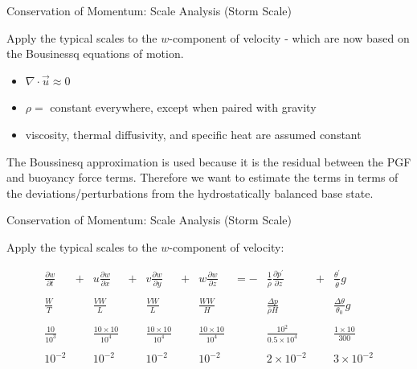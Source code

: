 \begin{frame}{Conservation of Momentum: Scale Analysis (Storm Scale)}

Apply the typical scales to the $w$-component of velocity - which are now based on the Bousinessq equations of motion.

\begin{itemize}
\item $\nabla \cdot \vec{u} \approx 0$
\item $\rho =$ constant everywhere, except when paired with gravity
\item viscosity, thermal diffusivity, and specific heat are assumed constant
\end{itemize}

The Boussinesq approximation is used because it is the residual between the PGF and buoyancy force terms. Therefore we want to estimate the terms in terms of the deviations/perturbations from the hydrostatically balanced base state.
\end{frame}

\begin{frame}{Conservation of Momentum: Scale Analysis (Storm Scale)}

Apply the typical scales to the $w$-component of velocity:

\begin{align*}
&\frac{\partial w}{\partial t}& + &u \frac{\partial w}{\partial x}& +  &v \frac{\partial w}{\partial y}& + &w \frac{\partial w}{\partial z}& = -& \frac{1}{\overline{\rho}} \frac{\partial p^{\prime}}{\partial z}& + &\frac{\theta^{\prime}}{\overline{\theta}}g& \\\\
&\frac{W}{T}&  &\frac{VW}{L}& &\frac{VW}{L}& & \frac{WW}{H}& &\frac{\Delta p}{\overline{\rho} H}& &\frac{\Delta \theta}{\theta_0}g&\\\\
&\frac{10}{10^3}& &\frac{10\times10}{10^4}& &\frac{10\times10}{10^4}& &\frac{10\times10}{10^4}& &\frac{10^2}{0.5 \times 10^4}& &\frac{1 \times 10}{300}&\\\\
&10^{-2}& &10^{-2}& &10^{-2}&  &10^{-2}& &2 \times 10^{-2}& &3 \times 10^{-2}&
\end{align*}
\end{frame}

